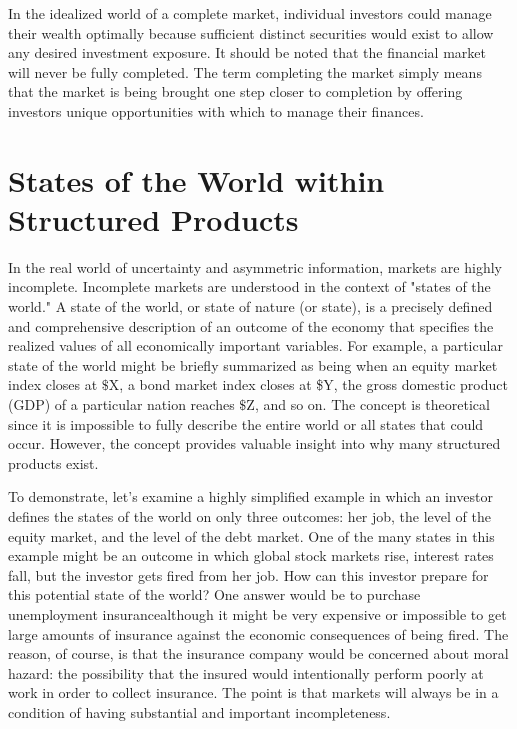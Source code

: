 \documentclass[11pt]{article}
\begin{document}
In the idealized world of a complete market, individual investors could manage their wealth optimally because sufficient distinct securities would exist to allow any desired investment exposure. It should be noted that the financial market will never be fully completed. The term completing the market simply means that the market is being brought one step closer to completion by offering investors unique opportunities with which to manage their finances.

\section*{States of the World within Structured Products}
In the real world of uncertainty and asymmetric information, markets are highly incomplete. Incomplete markets are understood in the context of "states of the world." A state of the world, or state of nature (or state), is a precisely defined and comprehensive description of an outcome of the economy that specifies the realized values of all economically important variables. For example, a particular state of the world might be briefly summarized as being when an equity market index closes at $\$ \mathrm{X}$, a bond market index closes at \$Y, the gross domestic product (GDP) of a particular nation reaches $\$ \mathrm{Z}$, and so on. The concept is theoretical since it is impossible to fully describe the entire world or all states that could occur. However, the concept provides valuable insight into why many structured products exist.

To demonstrate, let's examine a highly simplified example in which an investor defines the states of the world on only three outcomes: her job, the level of the equity market, and the level of the debt market. One of the many states in this example might be an outcome in which global stock markets rise, interest rates fall, but the investor gets fired from her job. How can this investor prepare for this potential state of the world? One answer would be to purchase unemployment insurancealthough it might be very expensive or impossible to get large amounts of insurance against the economic consequences of being fired. The reason, of course, is that the insurance company would be concerned about moral hazard: the possibility that the insured would intentionally perform poorly at work in order to collect insurance. The point is that markets will always be in a condition of having substantial and important incompleteness.
\end{document}
